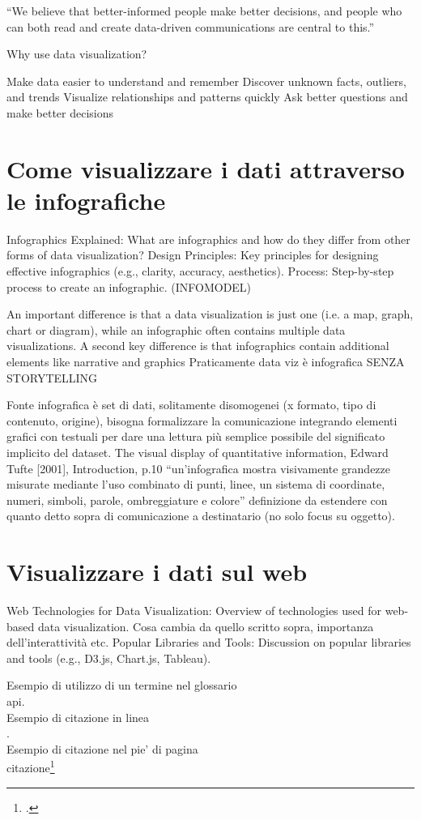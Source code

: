 “We believe that better-informed people make better decisions, and people who can both read and create data-driven communications are central to this.”

Why use data visualization?

    Make data easier to understand and remember
    Discover unknown facts, outliers, and trends
    Visualize relationships and patterns quickly
    Ask better questions and make better decisions


\section{Come visualizzare i dati attraverso le infografiche}
Infographics Explained: What are infographics and how do they differ from other forms of data visualization?
Design Principles: Key principles for designing effective infographics (e.g., clarity, accuracy, aesthetics).
Process: Step-by-step process to create an infographic. (INFOMODEL)

An important difference is that a data visualization is just one (i.e. a map, graph, chart or diagram), while an infographic often contains multiple data visualizations. A second key difference is that infographics contain additional elements like narrative and graphics
Praticamente data viz è infografica SENZA STORYTELLING

Fonte infografica è set di dati, solitamente disomogenei (x formato, tipo di contenuto, origine), bisogna formalizzare la comunicazione integrando elementi grafici con testuali per dare una lettura più semplice possibile del significato implicito del dataset.
The visual display of quantitative information, Edward Tufte [2001], Introduction, p.10 “un’infografica mostra visivamente grandezze misurate mediante l’uso combinato di punti, linee, un sistema di coordinate, numeri, simboli, parole, ombreggiature e colore” definizione da estendere con quanto detto sopra di comunicazione a destinatario (no solo focus su oggetto). 


\section{Visualizzare i dati sul web}
Web Technologies for Data Visualization: Overview of technologies used for web-based data visualization.
Cosa cambia da quello scritto sopra, importanza dell'interattività etc.
Popular Libraries and Tools: Discussion on popular libraries and tools (e.g., D3.js, Chart.js, Tableau).


\noindent Esempio di utilizzo di un termine nel glossario \\
\gls{api}. \\

\noindent Esempio di citazione in linea \\
\cite{site:agile-manifesto}. \\

\noindent Esempio di citazione nel pie' di pagina \\
citazione\footcite{womak:lean-thinking} \\